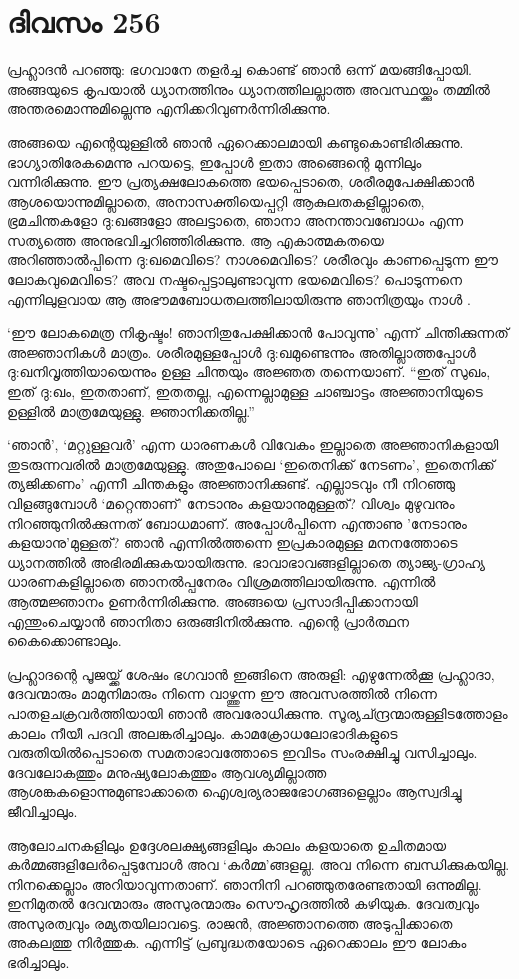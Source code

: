 \section{ദിവസം 256}


പ്രഹ്ലാദന്‍ പറഞ്ഞു: ഭഗവാനേ തളര്‍ച്ച കൊണ്ട് ഞാന്‍ ഒന്ന് മയങ്ങിപ്പോയി. അങ്ങയുടെ കൃപയാല്‍ ധ്യാനത്തിനും ധ്യാനത്തിലല്ലാത്ത അവസ്ഥയ്ക്കും തമ്മില്‍ അന്തരമൊന്നുമില്ലെന്നു എനിക്കറിവുണര്‍ന്നിരിക്കുന്നു.

അങ്ങയെ എന്റെയുള്ളില്‍ ഞാന്‍ ഏറെക്കാലമായി കണ്ടുകൊണ്ടിരിക്കുന്നു. ഭാഗ്യാതിരേകമെന്നു പറയട്ടെ, ഇപ്പോള്‍ ഇതാ അങ്ങെന്റെ മുന്നിലും വന്നിരിക്കുന്നു. ഈ പ്രത്യക്ഷലോകത്തെ ഭയപ്പെടാതെ, ശരീരമുപേക്ഷിക്കാന്‍ ആശയൊന്നുമില്ലാതെ, അനാസക്തിയെപ്പറ്റി ആകുലതകളില്ലാതെ, ഭ്രമചിന്തകളോ ദു:ഖങ്ങളോ അലട്ടാതെ, ഞാനാ അനന്താവബോധം എന്ന സത്യത്തെ അനുഭവിച്ചറിഞ്ഞിരിക്കുന്നു. ആ എകാത്മകതയെ അറിഞ്ഞാല്‍പ്പിന്നെ ദു:ഖമെവിടെ? നാശമെവിടെ? ശരീരവും കാണപ്പെടുന്ന ഈ ലോകവുമെവിടെ? അവ നഷ്ടപ്പെട്ടാലുണ്ടാവുന്ന ഭയമെവിടെ? പൊടുന്നനെ എന്നിലുളവായ ആ അഭൗമബോധതലത്തിലായിരുന്നു ഞാനിത്രയും നാള്‍ .

‘ഈ ലോകമെത്ര നികൃഷ്ടം! ഞാനിതുപേക്ഷിക്കാന്‍ പോവുന്നു’ എന്ന് ചിന്തിക്കുന്നത് അജ്ഞാനികള്‍ മാത്രം. ശരീരമുള്ളപ്പോള്‍ ദു:ഖമുണ്ടെന്നും അതില്ലാത്തപ്പോള്‍ ദു:ഖനിവൃത്തിയായെന്നും ഉള്ള ചിന്തയും അജ്ഞത തന്നെയാണ്. “ഇത് സുഖം, ഇത് ദു:ഖം, ഇതതാണ്, ഇതതല്ല, എന്നെല്ലാമുള്ള ചാഞ്ചാട്ടം അജ്ഞാനിയുടെ ഉള്ളില്‍ മാത്രമേയുള്ളു. ജ്ഞാനിക്കതില്ല.” 

‘ഞാന്‍’, ‘മറ്റുള്ളവര്‍’ എന്ന ധാരണകള്‍  വിവേകം ഇല്ലാതെ അജ്ഞാനികളായി തുടരുന്നവരില്‍ മാത്രമേയുള്ളു. അതുപോലെ ‘ഇതെനിക്ക് നേടണം’, ഇതെനിക്ക് ത്യജിക്കണം’ എന്നീ ചിന്തകളും അജ്ഞാനിക്കുണ്ട്. എല്ലാടവും നീ നിറഞ്ഞു വിളങ്ങുമ്പോള്‍ ‘മറ്റെന്താണ്’ നേടാനും കളയാനുമുള്ളത്? വിശ്വം മുഴുവനും നിറഞ്ഞുനില്‍ക്കുന്നത് ബോധമാണ്. അപ്പോള്‍പ്പിന്നെ എന്താണു 'നേടാനും കളയാനു'മുള്ളത്? ഞാന്‍ എന്നില്‍ത്തന്നെ ഇപ്രകാരമുള്ള മനനത്തോടെ ധ്യാനത്തില്‍  അഭിരമിക്കുകയായിരുന്നു. ഭാവാഭാവങ്ങളില്ലാതെ ത്യാജ്യ-ഗ്രാഹ്യ ധാരണകളില്ലാതെ ഞാനല്‍പ്പനേരം വിശ്രമത്തിലായിരുന്നു. എന്നില്‍ ആത്മജ്ഞാനം ഉണര്‍ന്നിരിക്കുന്നു. അങ്ങയെ പ്രസാദിപ്പിക്കാനായി എന്തുംചെയ്യാന്‍ ഞാനിതാ ഒരുങ്ങിനില്‍ക്കുന്നു. എന്റെ പ്രാര്‍ത്ഥന കൈക്കൊണ്ടാലും.

പ്രഹ്ലാദന്റെ പൂജയ്ക്ക് ശേഷം ഭഗവാന്‍ ഇങ്ങിനെ അരുളി: എഴുന്നേല്‍ക്കൂ പ്രഹ്ലാദാ, ദേവന്മാരും മാമുനിമാരും നിന്നെ വാഴ്ത്തുന്ന ഈ അവസരത്തില്‍ നിന്നെ പാതളചക്രവര്‍ത്തിയായി ഞാന്‍ അവരോധിക്കുന്നു. സൂര്യച്ന്ദ്രന്മാരുള്ളിടത്തോളം കാലം നീയീ പദവി അലങ്കരിച്ചാലും. കാമക്രോധലോഭാദികളുടെ വരുതിയില്‍പ്പെടാതെ സമതാഭാവത്തോടെ ഇവിടം സംരക്ഷിച്ചു വസിച്ചാലും. ദേവലോകത്തും മനുഷ്യലോകത്തും ആവശ്യമില്ലാത്ത ആശങ്കകളൊന്നുമുണ്ടാക്കാതെ ഐശ്വര്യരാജഭോഗങ്ങളെല്ലാം ആസ്വദിച്ചു ജീവിച്ചാലും.

ആലോചനകളിലും ഉദ്ദേശലക്ഷ്യങ്ങളിലും കാലം കളയാതെ ഉചിതമായ കര്‍മ്മങ്ങളിലേര്‍പ്പെടുമ്പോള്‍ അവ ‘കര്‍മ്മ’ങ്ങളല്ല. അവ നിന്നെ ബന്ധിക്കുകയില്ല. നിനക്കെല്ലാം അറിയാവുന്നതാണ്. ഞാനിനി പറഞ്ഞുതരേണ്ടതായി ഒന്നുമില്ല. ഇനിമുതല്‍ ദേവന്മാരും അസുരന്മാരും സൌഹൃദത്തില്‍ കഴിയുക. ദേവത്വവും അസുരത്വവും രമ്യതയിലാവട്ടെ. രാജന്‍, അജ്ഞാനത്തെ അടുപ്പിക്കാതെ അകലത്തു നിര്‍ത്തുക. എന്നിട്ട് പ്രബുദ്ധതയോടെ ഏറെക്കാലം ഈ ലോകം ഭരിച്ചാലും. 
